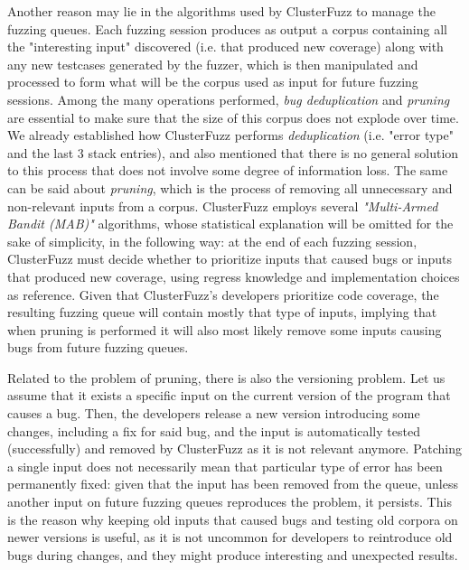 Another reason may lie in the algorithms used by ClusterFuzz to manage the fuzzing queues. Each fuzzing session produces as output a corpus containing all the "interesting input" discovered (i.e. that produced new coverage) along with any new testcases generated by the fuzzer, which is then manipulated and processed to form what will be the corpus used as input for future fuzzing sessions. Among the many operations performed, \textit{bug deduplication} and \textit{pruning} are essential to make sure that the size of this corpus does not explode over time. We already established how ClusterFuzz performs \textit{deduplication} (i.e. "error type" and the last 3 stack entries), and also mentioned that there is no general solution to this process that does not involve some degree of information loss.
The same can be said about \textit{pruning}, which is the process of removing all unnecessary and non-relevant inputs from a corpus. ClusterFuzz employs several \textit{"Multi-Armed Bandit (MAB)"} \cite{mab} algorithms, whose statistical explanation will be omitted for the sake of simplicity, in the following way: at the end of each fuzzing session, ClusterFuzz must decide whether to prioritize inputs that caused bugs or inputs that produced new coverage, using regress knowledge and implementation choices as reference. Given that ClusterFuzz's developers prioritize code coverage, the resulting fuzzing queue will contain mostly that type of inputs, implying that when pruning is performed it will also most likely remove some inputs causing bugs from future fuzzing queues.

Related to the problem of pruning, there is also the versioning problem.
Let us assume that it exists a specific input on the current version of the program that causes a bug. Then, the developers release a new version introducing some changes, including a fix for said bug, and the input is automatically tested (successfully) and removed by ClusterFuzz as it is not relevant anymore. Patching a single input does not necessarily mean that particular type of error has been permanently fixed: given that the input has been removed from the queue, unless another input on future fuzzing queues reproduces the problem, it persists. This is the reason why keeping old inputs that caused bugs and testing old corpora on newer versions is useful, as it is not uncommon for developers to reintroduce old bugs during changes, and they might produce interesting and unexpected results.


